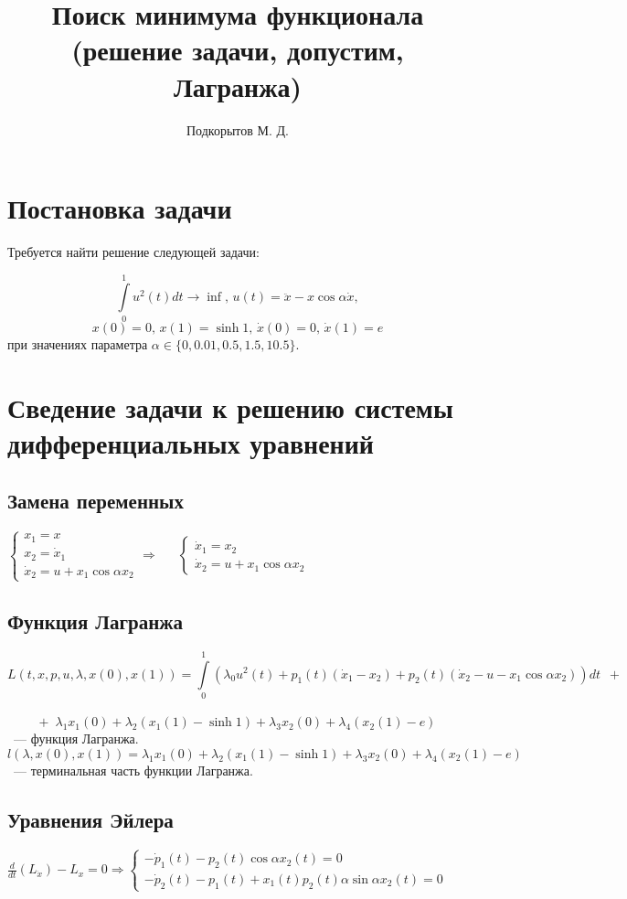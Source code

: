\documentclass[24pt]{article}
\title{Поиск минимума функционала (решение задачи, допустим, Лагранжа)}
\author{Подкорытов М. Д.}
\begin{document}
\maketitle

\section{Постановка задачи}
Требуется найти решение следующей задачи:

\[
\int\limits_0^1u^2(t)dt \rightarrow \inf, \, u(t) = \ddot x - x\cos \alpha \dot x,
\]
\[
x(0) = 0, \, x(1) = \sinh 1,\, \dot x(0) = 0,\, \dot x(1) = e 
\]
при значениях параметра $\alpha \in \{0, 0.01, 0.5, 1.5, 10.5\}$.

\section{Сведение задачи к решению системы дифференциальных уравнений}
\subsection{Замена переменных}
$
\begin{cases}
x_1 = x\\
x_2 = \dot x_1 \\
\dot x_2 = u + x_1 \cos \alpha x_2
\end{cases}
\Rightarrow\,\,\,\,\,\,\,\,\,
\begin{cases}
\dot x_1  = x_2\\
\dot x_2 = u + x_1 \cos \alpha x_2
\end{cases}
$
\subsection{Функция Лагранжа}
$$
L(t, x, p, u, \lambda, x(0), x(1)) = \int\limits_0^1\left(\lambda_0u^2\left(t\right)+p_1\left(t\right)\left(\dot x_1 - x_2\right) + p_2\left(t\right)\left(\dot x_2 - u - x_1\cos\alpha x_2\right)\right)dt \,\,\, + 
$$
\\
$$
+ \,\,\, \lambda_1x_1(0) + \lambda_2 \left(x_1\left(1\right) - \sinh 1\right) + \lambda_3 x_2(0) + \lambda_4 \left(x_2(1) - e\right)
$$~--- функция Лагранжа.
$$l(\lambda, x(0), x(1)) = \lambda_1x_1(0) + \lambda_2 \left(x_1\left(1\right) - \sinh 1\right) + \lambda_3 x_2(0) + \lambda_4 \left(x_2(1) - e\right)$$~--- терминальная часть функции Лагранжа.
\subsection{Уравнения Эйлера}
$
\frac{d}{dt} (L_{\dot x}) - L_{x} = 0 \Rightarrow 
\begin{cases}
-\dot p_1\left(t\right) - p_2\left(t\right)\cos\alpha x_2\left(t\right) = 0\\
-\dot p_2\left(t\right) - p_1\left(t\right) + x_1\left(t\right)p_2\left(t\right)\alpha\sin\alpha x_2\left(t\right) = 0
\end{cases}
$
\end{document}
